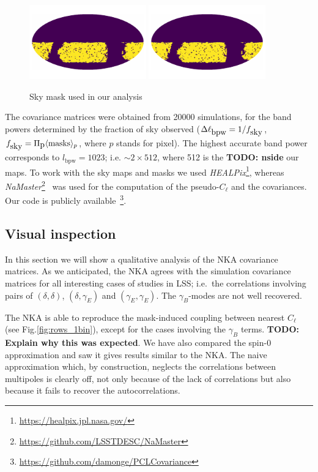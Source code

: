 \documentclass[a4paper,11pt]{article}
\newcommand{\todo}[1]{{\bf TODO: #1}}
\newcommand{\fsky}{f_{\mbox{\rm sky}}}
\newcommand{\cl}{C_\ell}
\newcommand{\lbpw}{\ell_{\mbox{bpw}}}
\newcommand{\fsky}{f_{\mbox{sky}}}
\begin{document}
\begin{figure}
  \centering
  \includegraphics[width=0.45\textwidth]{./figures/mask-lss1.pdf}
  \includegraphics[width=0.45\textwidth]{./figures/mask-lss2.pdf}
  \caption{Sky mask used in our analysis}
  \label{fig:mask}
\end{figure}

The covariance matrices were obtained from 20000 simulations, for the band
powers determined by the fraction of sky observed ($\Delta \lbpw = 1/\fsky$,
$\fsky = \Pi_{\mbox{p}} \langle \mbox{masks} \rangle_{p}$, where $p$ stands
for pixel). The highest accurate band power corresponds to $l_{\mbox{bpw}} =
1023$; i.e. $\sim 2 \times 512$, where 512 is the \todo{nside} our maps. To
work with the sky maps and masks we used
\textit{HEALPix}\footnote{\url{https://healpix.jpl.nasa.gov/}}, whereas
\textit{NaMaster}\footnote{\url{https://github.com/LSSTDESC/NaMaster}}~\cite{2018arXiv180909603A}
was used for the computation of the pseudo-$\cl$ and the covariances. Our code
is publicly
available~\footnote{\url{https://github.com/damonge/PCLCovariance}}.


\subsection{Visual inspection}

In this section we will show a qualitative analysis of the NKA covariance
matrices. As we anticipated, the NKA agrees with the simulation covariance
matrices for all interesting cases of studies in LSS; i.e.\ the correlations
involving pairs of $(\delta, \delta)$, $(\delta, \gamma_E)$ and $(\gamma_E,
\gamma_E)$. The $\gamma_B$-modes are not well recovered. 

The NKA is able to reproduce the mask-induced coupling between
nearest $\cl$ (see Fig.\ref{fig:rows_1bin}), except for the cases involving
the $\gamma_B$ terms. \todo{Explain why this was expected}. We have also
compared the spin-0 approximation and saw it gives results similar to the NKA.
The naive approximation which, by construction, neglects the correlations
between multipoles is clearly off, not only because of the lack of
correlations but also because it fails to recover the autocorrelations. 
\end{document}
